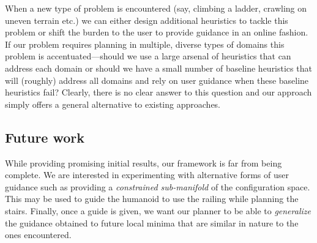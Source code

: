 \documentclass[conference]{IEEEtran}
\begin{document}
When a new type of problem is encountered 
(say, climbing a ladder, crawling on uneven terrain etc.)
we can either design additional heuristics to tackle this problem or shift the burden to the user to provide guidance in an online fashion.
If our problem requires planning in multiple, diverse types of domains this problem is accentuated---should we  use a large arsenal of heuristics that can address each domain or should we have a small number of baseline heuristics that will (roughly) address all domains and rely on user guidance when these baseline heuristics fail?
Clearly, there is no clear answer to this question and our approach simply offers a general alternative to existing approaches.


\subsection{Future work}
While providing promising initial results, our framework is far from being complete.
We are interested in experimenting with alternative forms of user guidance such as providing a \emph{constrained sub-manifold} of the configuration space. This may be used to guide the humanoid to use the railing while planning the stairs.
Finally, once a guide is given, we want our planner to be able to \emph{generalize} the guidance obtained to future local minima that are similar in nature to the ones encountered.



%


\end{document}
